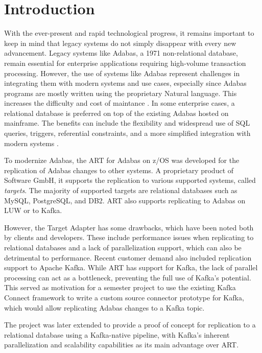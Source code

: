 \chapter{Introduction}
\label{ch01:intro}

With the ever-present and rapid technological progress, it remains important to keep in mind that legacy systems do not simply disappear with every new advancement. Legacy systems like Adabas, a 1971 non-relational database, remain essential for enterprise applications requiring high-volume transaction processing. However, the use of systems like Adabas represent challenges in integrating them with modern systems and use cases, especially since Adabas programs are mostly written using the proprietary Natural language. This increases the difficulty and cost of maintance \cite{ibm_redpaper_key}. In some enterprise cases, a relational database is preferred on top of the existing Adabas hosted on mainframe. The benefits can include the flexibility and widespread use of SQL queries, triggers, referential constraints, and a more simplified integration with modern systems \cite{ibm_redpaper_key}.

To modernize Adabas, the \ac{ART} for Adabas on z/OS was developed for the replication of Adabas changes to other systems. A proprietary product of Software GmbH, it supports the replication to various supported systems, called \textit{targets}. The majority of supported targets are relational databases such as MySQL, PostgreSQL, and DB2. \ac{ART} also supports replicating to Adabas on \ac{LUW} or to Kafka.

However, the Target Adapter has some drawbacks, which have been noted both by clients and developers. These include performance issues when replicating to relational databases and a lack of parallelization support, which can also be detrimental to performance. Recent customer demand also included replication support to Apache Kafka. While \ac{ART} has support for Kafka, the lack of parallel processing can act as a bottleneck, preventing the full use of Kafka's potential. This served as motivation for a semester project to use the existing Kafka Connect framework to write a custom source connector prototype for Kafka, which would allow replicating Adabas changes to a Kafka topic.

The project was later extended to provide a proof of concept for replication to a relational database using a Kafka-native pipeline, with Kafka's inherent parallelization and scalability capabilities \cite{peddireddy2023kafkadatalakebenefits} as its main advantage over \ac{ART}.

